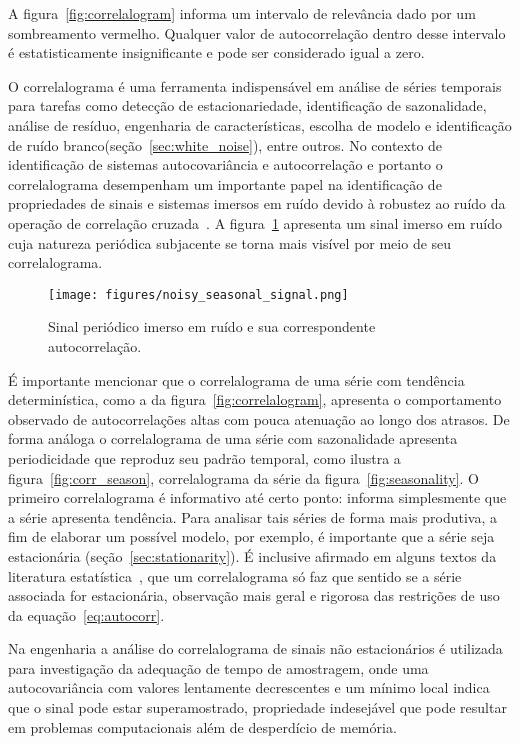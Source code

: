 A figura~\ref{fig:correlalogram} informa um intervalo de relevância dado por um
sombreamento vermelho. Qualquer valor de autocorrelação dentro desse intervalo
é estatisticamente insignificante e pode ser considerado igual a zero.

O correlalograma é uma ferramenta indispensável em análise de séries temporais
para tarefas como detecção de estacionariedade, identificação de sazonalidade,
análise de resíduo, engenharia de características, escolha de modelo e
identificação de ruído branco(seção~\ref{sec:white_noise}), entre outros. No
contexto de identificação de sistemas autocovariância e autocorrelação e
portanto o correlalograma desempenham um importante papel na identificação de
propriedades de sinais e sistemas imersos em ruído devido à robustez ao ruído
da operação de correlação cruzada~\cite{aguirre}. A figura~\ref{fig:noisy_sine}
apresenta um sinal imerso em ruído cuja natureza periódica subjacente se torna
mais visível por meio de seu correlalograma.

\begin{figure}
    \centering
    \texttt{[image: figures/noisy\_seasonal\_signal.png]}
    \caption{Sinal periódico imerso em ruído e sua correspondente autocorrelação.}
    \label{fig:noisy_sine}
\end{figure}

É importante mencionar que o correlalograma de uma série com tendência
determinística, como a da figura~\ref{fig:correlalogram}, apresenta o
comportamento observado de autocorrelações altas com pouca atenuação ao longo
dos atrasos. De forma análoga o correlalograma de uma série com sazonalidade
apresenta periodicidade que reproduz seu padrão temporal, como ilustra a
figura~\ref{fig:corr_season}, correlalograma da série da
figura~\ref{fig:seasonality}. O primeiro correlalograma é informativo até
certo ponto: informa simplesmente que a série apresenta tendência. Para
analisar tais séries de forma mais produtiva, a fim de elaborar um possível
modelo, por exemplo, é importante que a série seja estacionária
(seção~\ref{sec:stationarity}). É inclusive afirmado em alguns textos da
literatura estatística~\cite{chatfield}, que um correlalograma só faz que
sentido se a série associada for estacionária, observação mais geral e rigorosa
das restrições de uso da equação~\ref{eq:autocorr}.

Na engenharia a análise do correlalograma de sinais não estacionários é
utilizada para investigação da adequação de tempo de amostragem, onde uma
autocovariância com valores lentamente decrescentes e um mínimo local indica que
o sinal pode estar superamostrado, propriedade indesejável que pode resultar em
problemas computacionais além de desperdício de memória.

